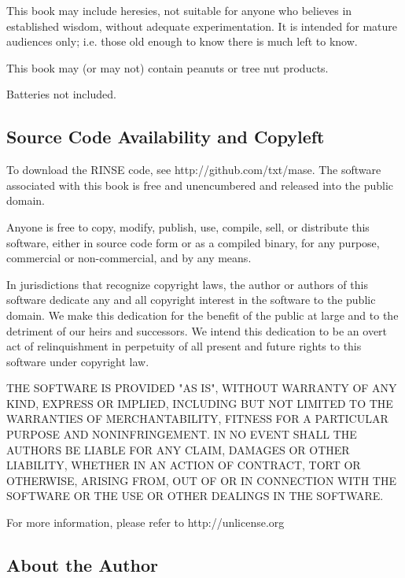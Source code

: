 \documentclass[9pt,twocolumn]{article}
\begin{document}
This book may include heresies, not suitable for anyone  who believes in established wisdom, without
adequate experimentation. It is
intended for mature audiences only; i.e.  those
old enough to know there is much left to know. 

This book may (or may not) contain peanuts or tree nut products.

Batteries not included.

\newpage

\tableofcontents

\newpage

   
\subsection*{Source Code Availability and Copyleft}
To download the RINSE code, see http://github.com/txt/mase.
The software associated with this book
is free and unencumbered and released into the public domain. 

Anyone is free to copy, modify, publish, use, compile, sell, or
distribute this software, either in source code form or as a compiled
binary, for any purpose, commercial or non-commercial, and by any
means.

In jurisdictions that recognize copyright laws, the author or authors
of this software dedicate any and all copyright interest in the
software to the public domain. We make this dedication for the benefit
of the public at large and to the detriment of our heirs and
successors. We intend this dedication to be an overt act of
relinquishment in perpetuity of all present and future rights to this
software under copyright law.

THE SOFTWARE IS PROVIDED "AS IS", WITHOUT WARRANTY OF ANY KIND,
EXPRESS OR IMPLIED, INCLUDING BUT NOT LIMITED TO THE WARRANTIES OF
MERCHANTABILITY, FITNESS FOR A PARTICULAR PURPOSE AND NONINFRINGEMENT.
IN NO EVENT SHALL THE AUTHORS BE LIABLE FOR ANY CLAIM, DAMAGES OR
OTHER LIABILITY, WHETHER IN AN ACTION OF CONTRACT, TORT OR OTHERWISE,
ARISING FROM, OUT OF OR IN CONNECTION WITH THE SOFTWARE OR THE USE OR
OTHER DEALINGS IN THE SOFTWARE.

For more information, please refer to http://unlicense.org

\vfill

   \subsection*{About the Author}
\end{document}
